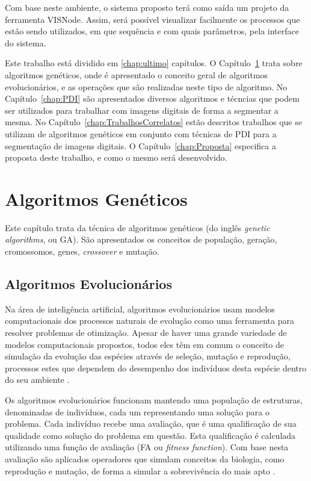 \documentclass[12pt,oneside,a4paper,english,french,spanish,brazil,]{abntex2}
\begin{document}
Com base neste ambiente, o sistema proposto terá como saída um projeto da ferramenta VISNode. Assim, será possível visualizar facilmente os processos que estão sendo utilizados, em que sequência e com quais parâmetros, pela interface do sistema.

Este trabalho está dividido em \ref{chap:ultimo} capítulos. O Capítulo~\ref{chap:AlgoritmosGeneticos} trata sobre algoritmos genéticos, onde é apresentado o conceito geral de algoritmos evolucionários, e as operações que são realizadas neste tipo de algoritmo. No Capítulo~\ref{chap:PDI} são apresentados diversos algoritmos e técncias que podem ser utilizados para trabalhar com imagens digitais de forma a segmentar a mesma. No Capítulo~\ref{chap:TrabalhosCorrelatos} estão descritos trabalhos que se utilizam de algoritmos genéticos em conjunto com técnicas de PDI para a segmentação de imagens digitais. O Capítulo~\ref{chap:Proposta} especifica a proposta deste trabalho, e como o mesmo será desenvolvido.


\chapter{Algoritmos Genéticos}
\label{chap:AlgoritmosGeneticos}

Este capítulo trata da técnica de algoritmos genéticos (do inglês \textit{genetic algorithms}, ou GA). São apresentados os conceitos de população, geração, cromossomos, genes, \textit{crossover} e mutação.

\section{Algoritmos Evolucionários}

Na área de inteligência artificial, algoritmos evolucionários usam modelos computacionais dos processos naturais de evolução como uma ferramenta para resolver problemas de otimização. Apesar de haver uma grande variedade de modelos computacionais propostos, todos eles têm em comum o conceito de simulação da evolução das espécies através de seleção, mutação e reprodução, processos estes que dependem do desempenho dos indivíduos desta espécie dentro do seu ambiente \cite{linden:2008}.

Os algoritmos evolucionários funcionam mantendo uma população de estruturas, denominadas de indivíduos, cada um representando uma solução para o problema. Cada indivíduo recebe uma avaliação, que é uma qualificação de sua qualidade como solução do problema em questão. Esta qualificação é calculada utilizando uma função de avaliação (FA ou \textit{fitness function}). Com base nesta avaliação são aplicados operadores que simulam conceitos da biologia, como reprodução e mutação, de forma a simular a sobrevivência do mais apto \cite{linden:2008}.
\end{document}
